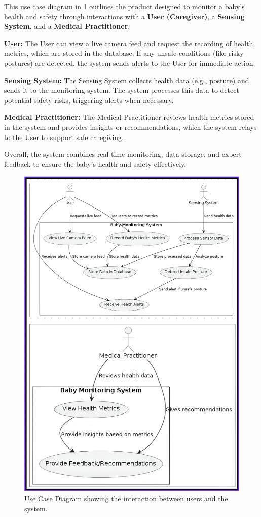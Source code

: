 \documentclass[conference]{IEEEtran}
\begin{document}
This use case diagram in \ref{fig:usecase} outlines the product designed to monitor a baby’s health and safety through interactions with a \textbf{User (Caregiver)}, a \textbf{Sensing System}, and a \textbf{Medical Practitioner}.

\textbf{User:} The User can view a live camera feed and request the recording of health metrics, which are stored in the database. If any unsafe conditions (like risky postures) are detected, the system sends alerts to the User for immediate action.
    
\textbf{Sensing System:} The Sensing System collects health data (e.g., posture) and sends it to the monitoring system. The system processes this data to detect potential safety risks, triggering alerts when necessary.
    
\textbf{Medical Practitioner:} The Medical Practitioner reviews health metrics stored in the system and provides insights or recommendations, which the system relays to the User to support safe caregiving.


Overall, the system combines real-time monitoring, data storage, and expert feedback to ensure the baby’s health and safety effectively.

\begin{figure}[hbtp]
  \centering
  \includegraphics[scale=0.5]{./pic/Use case.png}
  \caption{Use Case Diagram showing the interaction between users and the system.}
  \label{fig:usecase}
\end{figure}
\end{document}
